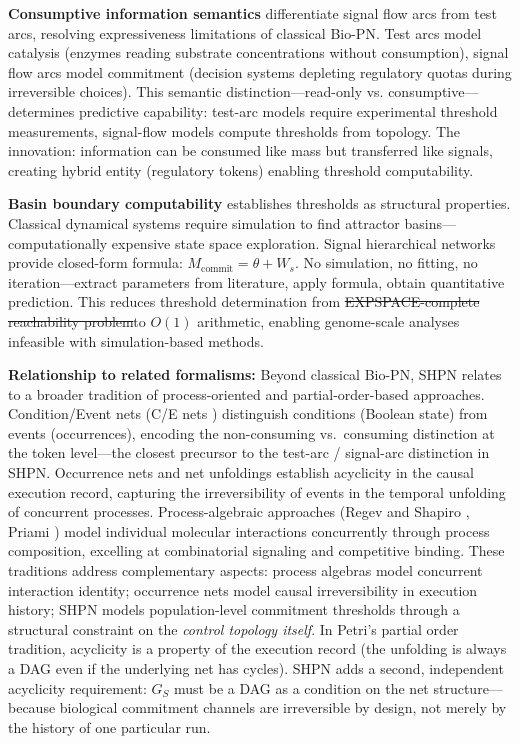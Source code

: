 \documentclass[10pt,letterpaper]{article}
\providecommand{\DIFaddtex}[1]{{\protect\color{blue}\uwave{#1}}} %
\providecommand{\DIFdeltex}[1]{{\protect\color{red}\sout{#1}}}                      %
\providecommand{\DIFaddbegin}{} %
\providecommand{\DIFaddend}{} %
\providecommand{\DIFdelbegin}{} %
\providecommand{\DIFdelend}{} %
\providecommand{\DIFadd}[1]{\texorpdfstring{\DIFaddtex{#1}}{#1}} %
\providecommand{\DIFdel}[1]{\texorpdfstring{\DIFdeltex{#1}}{}} %
\newcommand{\DIFscaledelfig}{0.5}
\newlength{\DIFdelgraphicswidth} %
\newlength{\DIFdelgraphicsheight} %
\newcommand{\DIFaddincludegraphics}[2][]{{\color{blue}\fbox{\DIFOincludegraphics[#1]{#2}}}} %
\newcommand{\DIFdelincludegraphics}[2][]{%
\sbox{\DIFdelgraphicsbox}{\DIFOincludegraphics[#1]{#2}}%
\settoboxwidth{\DIFdelgraphicswidth}{\DIFdelgraphicsbox} %
\settoboxtotalheight{\DIFdelgraphicsheight}{\DIFdelgraphicsbox} %
\scalebox{\DIFscaledelfig}{%
\parbox[b]{\DIFdelgraphicswidth}{\usebox{\DIFdelgraphicsbox}\\[-\baselineskip] \rule{\DIFdelgraphicswidth}{0em}}\llap{\resizebox{\DIFdelgraphicswidth}{\DIFdelgraphicsheight}{%
\setlength{\unitlength}{\DIFdelgraphicswidth}%
\begin{picture}(1,1)%
\thicklines\linethickness{2pt} %
{\color[rgb]{1,0,0}\put(0,0){\framebox(1,1){}}}%
{\color[rgb]{1,0,0}\put(0,0){\line( 1,1){1}}}%
{\color[rgb]{1,0,0}\put(0,1){\line(1,-1){1}}}%
\end{picture}%
}\hspace*{3pt}}} %
} %
\DeclareRobustCommand{\DIFaddbegin}{\DIFOaddbegin \let\includegraphics\DIFaddincludegraphics} %
\DeclareRobustCommand{\DIFaddend}{\DIFOaddend \let\includegraphics\DIFOincludegraphics} %
\DeclareRobustCommand{\DIFdelbegin}{\DIFOdelbegin \let\includegraphics\DIFdelincludegraphics} %
\DeclareRobustCommand{\DIFdelend}{\DIFOaddend \let\includegraphics\DIFOincludegraphics} %
\begin{document}
\textbf{Consumptive information semantics} differentiate signal flow arcs from test arcs, resolving expressiveness limitations of classical Bio-PN. Test arcs model catalysis (enzymes reading substrate concentrations without consumption), signal flow arcs model commitment (decision systems depleting regulatory quotas during irreversible choices). This semantic distinction---read-only vs. consumptive---determines predictive capability: test-arc models require experimental threshold measurements, signal-flow models compute thresholds from topology. The innovation: information can be consumed like mass but transferred like signals, creating hybrid entity (regulatory tokens) enabling threshold computability.

\textbf{Basin boundary computability} establishes thresholds as structural properties. Classical dynamical systems require simulation to find attractor basins---computationally expensive state space exploration. Signal hierarchical networks provide closed-form formula: $M_{\text{commit}} = \theta + W_s$. No simulation, no fitting, no iteration---extract parameters from literature, apply formula, obtain quantitative prediction. This reduces threshold determination from \DIFdelbegin \DIFdel{EXPSPACE-complete reachability problem}\DIFdelend \DIFaddbegin \DIFadd{Ackermann-complete reachability problem~\mbox{%
\cite{czerwinski2021} }\hskip0pt%
}\DIFaddend to $O(1)$ arithmetic, enabling genome-scale analyses infeasible with simulation-based methods.

\textbf{Relationship to related formalisms:} Beyond classical Bio-PN, SHPN relates to a broader tradition of process-oriented and partial-order-based approaches. Condition/Event nets (C/E nets \cite{rozenberg1998}) distinguish conditions (Boolean state) from events (occurrences), encoding the non-consuming vs.~consuming distinction at the token level---the closest precursor to the test-arc / signal-arc distinction in SHPN. Occurrence nets and net unfoldings \cite{nielsen1981,winskel1987} establish acyclicity in the causal execution record, capturing the irreversibility of events in the temporal unfolding of concurrent processes. Process-algebraic approaches (Regev and Shapiro \cite{regev2002}, Priami \cite{priami2005}) model individual molecular interactions concurrently through process composition, excelling at combinatorial signaling and competitive binding. These traditions address complementary aspects: process algebras model concurrent interaction identity; occurrence nets model causal irreversibility in execution history; SHPN models population-level commitment thresholds through a structural constraint on the \textit{control topology itself}. In Petri's partial order tradition, acyclicity is a property of the execution record (the unfolding is always a DAG even if the underlying net has cycles). SHPN adds a second, independent acyclicity requirement: \DIFdelbegin \DIFdel{$G_S$ }\DIFdelend \DIFaddbegin \DIFadd{$G_s$ }\DIFaddend must be a DAG as a condition on the net structure---because biological commitment channels are irreversible by design, not merely by the history of one particular run.
\end{document}
